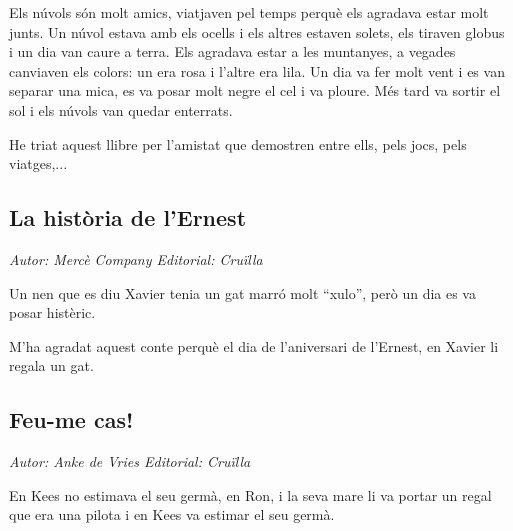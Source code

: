 \begin{news}
Els núvols són molt amics, viatjaven pel temps perquè els agradava estar molt junts. Un núvol estava amb els ocells i els altres estaven solets, els tiraven globus i un dia van caure a terra. Els agradava estar a les muntanyes, a vegades canviaven els colors: un era rosa i l’altre era lila. Un dia va fer molt vent i es van separar una mica, es va posar molt negre el cel i va ploure. Més tard va sortir el sol i els núvols van quedar enterrats.

He triat aquest llibre per l’amistat que demostren entre ells, pels jocs, pels viatges,...


\subsection*{La història de l’Ernest}
\emph{Autor: Mercè Company   Editorial: Cruïlla}


\noindent{}

Un nen que es diu Xavier tenia un gat marró molt “xulo”, però un dia es va posar histèric.

M’ha agradat aquest conte perquè el dia de l’aniversari de l’Ernest, en Xavier li regala un gat. 



\subsection*{Feu-me cas!}
\emph{Autor: Anke de Vries     Editorial: Cruïlla}

En Kees no estimava el seu germà, en Ron, i la seva mare li va portar un regal que era una pilota i en Kees va estimar el seu germà.


\end{news}
